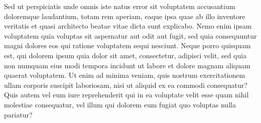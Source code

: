 \documentclass[a4paper,12pt]{article}
\theoremstyle{mytheor}
\begin{document}
        \noindent Sed ut perspiciatis unde omnis iste natus error sit voluptatem accusantium doloremque laudantium, totam rem aperiam, eaque ipsa quae ab illo inventore veritatis et quasi architecto beatae vitae dicta sunt explicabo. Nemo enim ipsam voluptatem quia voluptas sit aspernatur aut odit aut fugit, sed quia consequuntur magni dolores eos qui ratione voluptatem sequi nesciunt. Neque porro quisquam est, qui dolorem ipsum quia dolor sit amet, consectetur, adipisci velit, sed quia non numquam eius modi tempora incidunt ut labore et dolore magnam aliquam quaerat voluptatem. Ut enim ad minima veniam, quis nostrum exercitationem ullam corporis suscipit laboriosam, nisi ut aliquid ex ea commodi consequatur? Quis autem vel eum iure reprehenderit qui in ea voluptate velit esse quam nihil molestiae consequatur, vel illum qui dolorem eum fugiat quo voluptas nulla pariatur?
    \pagebreak
    \renewcommand*{\bibfont}{\raggedright}
        
        
\end{document}
